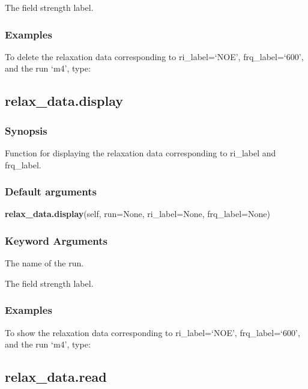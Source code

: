   The field strength label.

\subsubsection{Examples}

To delete the relaxation data corresponding to ri\_label=`NOE', frq\_label=`600', and the run
`m4', type:




\newpage

\subsection{relax\_data.display}


\subsubsection{Synopsis}

Function for displaying the relaxation data corresponding to ri\_label and frq\_label.

\subsubsection{Default arguments}

\textsf{\textbf{relax\_data.display}(self, run=None, ri\_label=None, frq\_label=None)}


\subsubsection{Keyword Arguments}

  The name of the run.

  The field strength label.

\subsubsection{Examples}

To show the relaxation data corresponding to ri\_label=`NOE', frq\_label=`600', and the run
`m4', type:




\newpage

\subsection{relax\_data.read}


